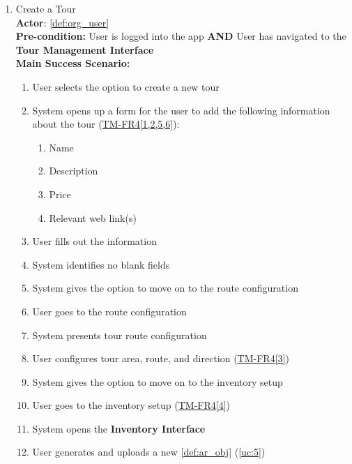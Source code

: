 \documentclass{article}
\begin{document}
\begin{enumerate}[label=\textbf{UC\arabic*}]

    \item \label{uc:2} Create a Tour \\
          \textbf{Actor}: \ref{def:org_user} \\
          \textbf{Pre-condition:} User is logged into the app \textbf{AND} User has navigated to the \textbf{Tour Management Interface} \\

          \textbf{Main Success Scenario:}
          \begin{enumerate}[label=\textbf{\arabic*.}]
              \item User selects the option to create a new tour
              \item System opens up a form for the user to add the following information about the tour (\hyperref[ssub:tour_management]{TM-FR4[1,2,5,6]}):
                    \begin{enumerate}
                        \item Name
                        \item Description
                        \item Price
                        \item Relevant web link(s)
                    \end{enumerate}
              \item User fills out the information
              \item System identifies no blank fields
              \item System gives the option to move on to the route configuration
              \item User goes to the route configuration
              \item System presents tour route configuration
              \item User configures tour area, route, and direction (\hyperref[ssub:tour_management]{TM-FR4[3]})
              \item System gives the option to move on to the inventory setup
              \item User goes to the inventory setup (\hyperref[ssub:tour_management]{TM-FR4[4]})
              \item System opens the \textbf{Inventory Interface}
              \item User generates and uploads a new \ref{def:ar_obj} (\ref{uc:5})

\end{enumerate}
\end{enumerate}
\end{document}
